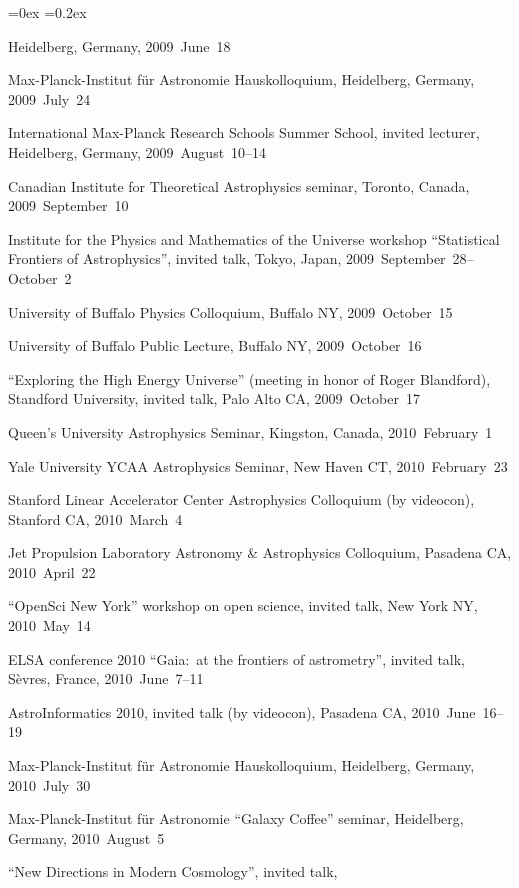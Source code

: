 \documentclass[12pt,letterpaper]{article}
\newcounter{refpubnum}
\newcommand{\hogglist}{%
    \rightmargin=0in
    \leftmargin=0.18in
    \topsep=0ex
    \partopsep=0pt
    \itemsep=0.2ex
    \parsep=0pt
    \itemindent=-1.0\leftmargin
    \listparindent=0.0\leftmargin
    \settowidth{\labelsep}{~}
    \usecounter{refpubnum}
  }
\begin{document}
\begin{list}{}{\hogglist}
{          Heidelberg, Germany, 2009~June~18
\item Max-Planck-Institut f\"ur Astronomie Hauskolloquium,
          Heidelberg, Germany, 2009~July~24
\item International Max-Planck Research Schools Summer School,
          invited lecturer,
          Heidelberg, Germany, 2009~August~10--14
\item Canadian Institute for Theoretical Astrophysics seminar,
          Toronto, Canada, 2009~September~10
\item Institute for the Physics and Mathematics of the Universe workshop
          ``Statistical Frontiers of Astrophysics'', invited talk,
          Tokyo, Japan, 2009~September~28--October~2
\item University of Buffalo Physics Colloquium,
          Buffalo NY, 2009~October~15
\item University of Buffalo Public Lecture,
          Buffalo NY, 2009~October~16
\item ``Exploring the High Energy Universe'' (meeting in honor of
          Roger Blandford), Standford University, invited talk,
          Palo Alto CA, 2009~October~17
\item Queen's University Astrophysics Seminar,
          Kingston, Canada, 2010~February~1
\item Yale University YCAA Astrophysics Seminar,
          New Haven CT, 2010~February~23
\item Stanford Linear Accelerator Center Astrophysics Colloquium (by videocon),
          Stanford CA, 2010~March~4
\item Jet Propulsion Laboratory Astronomy \& Astrophysics Colloquium,
          Pasadena CA, 2010~April~22
\item ``OpenSci New York'' workshop on open science, invited talk,
          New York NY, 2010~May~14
\item ELSA conference 2010 ``Gaia:\ at the frontiers of astrometry'',
          invited talk, S\`evres, France, 2010~June~7--11
\item AstroInformatics 2010, invited talk (by videocon),
          Pasadena CA, 2010~June~16--19
\item Max-Planck-Institut f\"ur Astronomie Hauskolloquium,
          Heidelberg, Germany, 2010~July~30
\item Max-Planck-Institut f\"ur Astronomie ``Galaxy Coffee'' seminar,
          Heidelberg, Germany, 2010~August~5
\item ``New Directions in Modern Cosmology'', invited talk,
}
\end{list}
\end{document}
